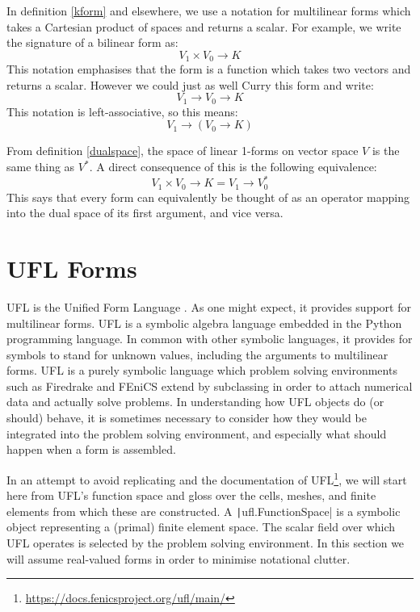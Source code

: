 \documentclass[a4paper,11pt]{article}
\begin{document}
In definition \ref{kform} and elsewhere, we use a notation for multilinear forms which takes a Cartesian product of spaces and returns a scalar. For example, we write the signature of a bilinear form as:
\begin{equation}
    V_1 \times V_0 \rightarrow K
\end{equation} 
This notation emphasises that the form is a function which takes two vectors and returns a scalar. However we could just as well Curry this form and write:
\begin{equation}  
    V_1 \rightarrow V_0 \rightarrow K
\end{equation} 
This notation is left-associative, so this means:
\begin{equation} 
    V_1 \rightarrow (V_0 \rightarrow K)
\end{equation} 

From definition \ref{dualspace}, the space of linear 1-forms on vector space $V$ is the same thing as $V^*$. 
A direct consequence of this is the following equivalence:
\begin{equation} 
    V_1 \times V_0 \rightarrow K = V_1 \rightarrow V_0^*
\end{equation}
This says that every form can equivalently be thought of as an operator mapping into the dual space of its first argument, and vice versa.

\section{UFL Forms}

UFL is the Unified Form Language \parencite{alnaes2014}. As one might expect, it provides support for multilinear forms. UFL is a symbolic algebra language embedded in the Python programming language. In common with other symbolic languages, it provides for symbols to stand for unknown values, including the arguments to multilinear forms. UFL is a purely symbolic language which problem solving environments such as Firedrake and FEniCS extend by subclassing in order to attach numerical data and actually solve problems. In understanding how UFL objects do (or should) behave, it is sometimes necessary to consider how they would be integrated into the problem solving environment, and especially what should happen when a form is assembled.

In an attempt to avoid replicating \textcite{alnaes2014} and the documentation
of UFL\footnote{\url{https://docs.fenicsproject.org/ufl/main/}}, we will start
here from UFL's function space and gloss over the cells, meshes, and finite
elements from which these are constructed. A
\texttt|ufl.FunctionSpace| is a symbolic object representing a
(primal) finite element space. The scalar field over which UFL operates is
selected by the problem solving environment. In this section we will assume
real-valued forms in order to minimise notational clutter.
\end{document}
